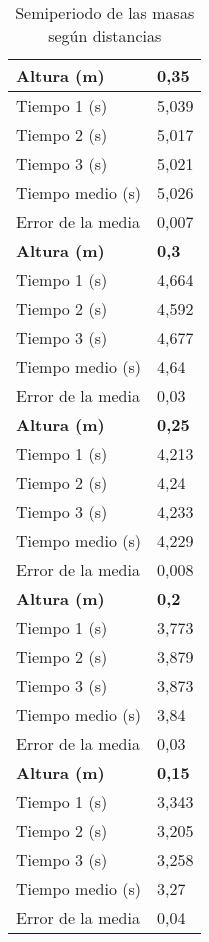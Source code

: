 \documentclass[a4paper,12pt,spanish]{article}
\begin{document}
\begin{table}[H]
\begin{minipage}[t]{.48\linewidth}
	\end{minipage}\hfill
	\mbox{}
	\begin{minipage}[t]{.48\linewidth}%
		\centering
		\begin{tabular}{|l|l|}
			\hline
			\textbf{Altura (m)}         & \textbf{0,35}   \\ \hline
			Tiempo 1 (s)      & 5,039 \\ \hline
			Tiempo 2 (s)      & 5,017 \\ \hline
			Tiempo 3 (s)      & 5,021 \\ \hline
			Tiempo medio (s)  & 5,026 \\ \hline
			Error de la media & 0,007 \\ \hline\hline
			\textbf{Altura (m)}         & \textbf{0,3}   \\ \hline
			Tiempo 1 (s)      & 4,664 \\ \hline
			Tiempo 2 (s)      & 4,592 \\ \hline
			Tiempo 3 (s)      & 4,677 \\ \hline
			Tiempo medio (s)  & 4,64  \\ \hline
			Error de la media & 0,03  \\ \hline\hline
			\textbf{Altura (m)}         & \textbf{0,25}   \\ \hline
			Tiempo 1 (s)      & 4,213 \\ \hline
			Tiempo 2 (s)      & 4,24  \\ \hline
			Tiempo 3 (s)      & 4,233 \\ \hline
			Tiempo medio (s)  & 4,229 \\ \hline
			Error de la media & 0,008 \\ \hline\hline
			\textbf{Altura (m)}         & \textbf{0,2}   \\ \hline
			Tiempo 1 (s)      & 3,773 \\ \hline
			Tiempo 2 (s)      & 3,879 \\ \hline
			Tiempo 3 (s)      & 3,873 \\ \hline
			Tiempo medio (s)  & 3,84  \\ \hline
			Error de la media & 0,03  \\ \hline\hline
			\textbf{Altura (m)}         & \textbf{0,15}   \\ \hline
			Tiempo 1 (s)      & 3,343 \\ \hline
			Tiempo 2 (s)      & 3,205 \\ \hline
			Tiempo 3 (s)      & 3,258 \\ \hline
			Tiempo medio (s)  & 3,27  \\ \hline
			Error de la media & 0,04  \\ \hline
		\end{tabular}
		
	\end{minipage}\hfill
	\mbox{}
	\caption{Semiperiodo de las masas según distancias}
\end{table}
\end{document}
